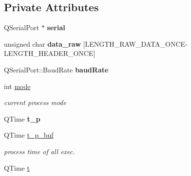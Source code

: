 \subsection*{Private Attributes}
\begin{DoxyCompactItemize}
\item 
\hypertarget{classlrf__controller_aa6492c79da222d2be63d04fafdf1803e}{}Q\+Serial\+Port $\ast$ {\bfseries serial}\label{classlrf__controller_aa6492c79da222d2be63d04fafdf1803e}

\item 
\hypertarget{classlrf__controller_a3ebac4db6b1fa224a38b146d39b4424f}{}unsigned char {\bfseries data\+\_\+raw} \mbox{[}L\+E\+N\+G\+T\+H\+\_\+\+R\+A\+W\+\_\+\+D\+A\+T\+A\+\_\+\+O\+N\+C\+E-\/L\+E\+N\+G\+T\+H\+\_\+\+H\+E\+A\+D\+E\+R\+\_\+\+O\+N\+C\+E\mbox{]}\label{classlrf__controller_a3ebac4db6b1fa224a38b146d39b4424f}

\item 
\hypertarget{classlrf__controller_ac3c479a9fa19940bd623b1ae3e2b88e8}{}Q\+Serial\+Port\+::\+Baud\+Rate {\bfseries baud\+Rate}\label{classlrf__controller_ac3c479a9fa19940bd623b1ae3e2b88e8}

\item 
\hypertarget{classlrf__controller_a805afcd6b3ca2c2b44c4f21b96e33e4c}{}int \hyperlink{classlrf__controller_a805afcd6b3ca2c2b44c4f21b96e33e4c}{mode}\label{classlrf__controller_a805afcd6b3ca2c2b44c4f21b96e33e4c}

\begin{DoxyCompactList}\small\item\em current process mode \end{DoxyCompactList}\item 
\hypertarget{classlrf__controller_a9180a22868cb0c7054af1c1abed6ec7b}{}Q\+Time {\bfseries t\+\_\+p}\label{classlrf__controller_a9180a22868cb0c7054af1c1abed6ec7b}

\item 
\hypertarget{classlrf__controller_a9fc493fe1842d5570496df7ebdccdd55}{}Q\+Time \hyperlink{classlrf__controller_a9fc493fe1842d5570496df7ebdccdd55}{t\+\_\+p\+\_\+buf}\label{classlrf__controller_a9fc493fe1842d5570496df7ebdccdd55}

\begin{DoxyCompactList}\small\item\em process time of all exec. \end{DoxyCompactList}\item 
\hypertarget{classlrf__controller_ad293d9d17eba64d16d367eb416e2251b}{}Q\+Time \hyperlink{classlrf__controller_ad293d9d17eba64d16d367eb416e2251b}{t}\label{classlrf__controller_ad293d9d17eba64d16d367eb416e2251b}


\end{DoxyCompactItemize}
